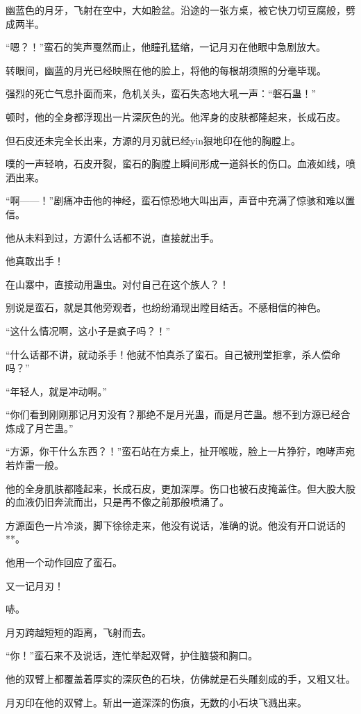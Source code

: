 \begin{this_body}
幽蓝色的月牙，飞射在空中，大如脸盆。沿途的一张方桌，被它快刀切豆腐般，劈成两半。

“嗯？！”蛮石的笑声戛然而止，他瞳孔猛缩，一记月刃在他眼中急剧放大。

转眼间，幽蓝的月光已经映照在他的脸上，将他的每根胡须照的分毫毕现。

强烈的死亡气息扑面而来，危机关头，蛮石失态地大吼一声：“磐石蛊！”

顿时，他的全身都浮现出一片深灰色的光。他浑身的皮肤都隆起来，长成石皮。

但石皮还未完全长出来，方源的月刃就已经yin狠地印在他的胸膛上。

噗的一声轻响，石皮开裂，蛮石的胸膛上瞬间形成一道斜长的伤口。血液如线，喷洒出来。

“啊——！”剧痛冲击他的神经，蛮石惊恐地大叫出声，声音中充满了惊骇和难以置信。

他从未料到过，方源什么话都不说，直接就出手。

他真敢出手！

在山寨中，直接动用蛊虫。对付自己在这个族人？！

别说是蛮石，就是其他旁观者，也纷纷涌现出瞠目结舌。不感相信的神色。

“这什么情况啊，这小子是疯子吗？！”

“什么话都不讲，就动杀手！他就不怕真杀了蛮石。自己被刑堂拒拿，杀人偿命吗？”

“年轻人，就是冲动啊。”

“你们看到刚刚那记月刃没有？那绝不是月光蛊，而是月芒蛊。想不到方源已经合炼成了月芒蛊。”

“方源，你干什么东西？！”蛮石站在方桌上，扯开喉咙，脸上一片狰狞，咆哮声宛若炸雷一般。

他的全身肌肤都隆起来，长成石皮，更加深厚。伤口也被石皮掩盖住。但大股大股的血液仍旧奔流而出，只是再不像之前那般喷涌了。

方源面色一片冷淡，脚下徐徐走来，他没有说话，准确的说。他没有开口说话的**。

他用一个动作回应了蛮石。

又一记月刃！

哧。

月刃跨越短短的距离，飞射而去。

“你！”蛮石来不及说话，连忙举起双臂，护住脑袋和胸口。

他的双臂上都覆盖着厚实的深灰色的石块，仿佛就是石头雕刻成的手，又粗又壮。

月刃印在他的双臂上。斩出一道深深的伤痕，无数的小石块飞溅出来。


\end{this_body}
